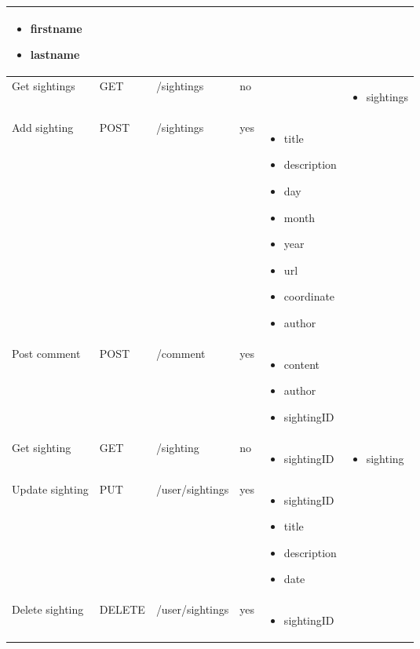 \documentclass{article}
\begin{document}
\begin{center}
\begin{longtable}{ |  l  |  l  |  l  |  p{2cm}  |  p{2.6cm}  |  p{3cm}  | }
\begin{itemize}
    \item firstname
    \item lastname
\end{itemize}     & \\ \hline
Get sightings & GET & /sightings & no & & \begin{itemize}
\item sightings
\end{itemize} \\ \hline
Add sighting & POST & /sightings & yes & \begin{itemize}
\item title
\item description
\item day
\item month
\item year
\item url
\item coordinate
\item author
\end{itemize} & \\ \hline
Post comment & POST & /comment & yes & \begin{itemize}
\item content
\item author
\item sightingID
\end{itemize} & \\ \hline
Get sighting & GET & /sighting & no & \begin{itemize}
\item sightingID
\end{itemize} & \begin{itemize}
\item sighting
\end{itemize} \\ \hline
Update sighting & PUT & /user/sightings & yes & \begin{itemize}
\item sightingID
\item title
\item description
\item date
\end{itemize} & \\ \hline
Delete sighting & DELETE & /user/sightings & yes & \begin{itemize}
\item sightingID
\end{itemize} & \\ \hline
    \end{longtable}
\end{center}
\end{document}
